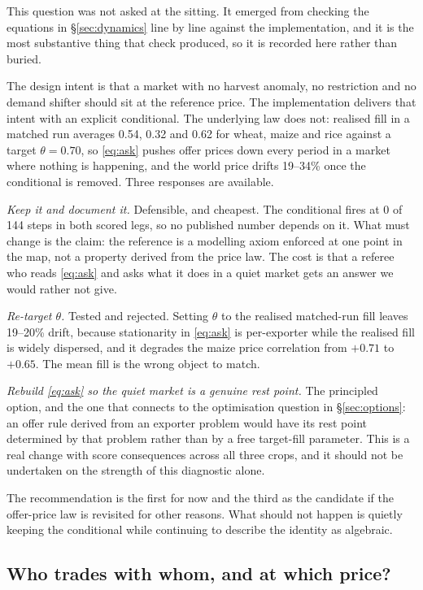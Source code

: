 This question was not asked at the sitting. It emerged from checking the
equations in \S\ref{sec:dynamics} line by line against the implementation,
and it is the most substantive thing that check produced, so it is recorded
here rather than buried.

The design intent is that a market with no harvest anomaly, no restriction
and no demand shifter should sit at the reference price. The implementation
delivers that intent with an explicit conditional. The underlying law does
not: realised fill in a matched run averages 0.54, 0.32 and 0.62 for wheat,
maize and rice against a target \(\theta=0.70\), so \eqref{eq:ask} pushes
offer prices down every period in a market where nothing is happening, and
the world price drifts 19--34\% once the conditional is removed. Three
responses are available.

\emph{Keep it and document it.} Defensible, and cheapest. The conditional
fires at 0 of 144 steps in both scored legs, so no published number depends
on it. What must change is the claim: the reference is a modelling axiom
enforced at one point in the map, not a property derived from the price law.
The cost is that a referee who reads \eqref{eq:ask} and asks what it does in
a quiet market gets an answer we would rather not give.

\emph{Re-target \(\theta\).} Tested and rejected. Setting \(\theta\) to the
realised matched-run fill leaves 19--20\% drift, because stationarity in
\eqref{eq:ask} is per-exporter while the realised fill is widely dispersed,
and it degrades the maize price correlation from \(+0.71\) to \(+0.65\). The
mean fill is the wrong object to match.

\emph{Rebuild \eqref{eq:ask} so the quiet market is a genuine rest point.}
The principled option, and the one that connects to the optimisation
question in \S\ref{sec:options}: an offer rule derived from an exporter
problem would have its rest point determined by that problem rather than by
a free target-fill parameter. This is a real change with score consequences
across all three crops, and it should not be undertaken on the strength of
this diagnostic alone.

The recommendation is the first for now and the third as the candidate if
the offer-price law is revisited for other reasons. What should not happen
is quietly keeping the conditional while continuing to describe the identity
as algebraic.

\subsection{Who trades with whom, and at which price?}

